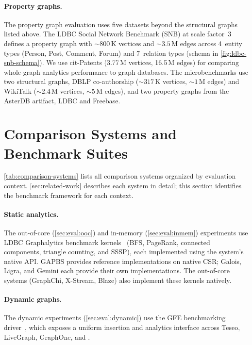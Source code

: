 \paragraph{Property graphs.}
The property graph evaluation uses five datasets beyond the structural graphs listed above.
The LDBC Social Network Benchmark (SNB) at scale factor~3 defines a property graph with ${\sim}800$\,K vertices and ${\sim}3.5$\,M edges across 4~entity types (Person, Post, Comment, Forum) and 7~relation types (schema in
\autoref{fig:ldbc-snb-schema}).
We use cit-Patents (3.77\,M vertices, 16.5\,M edges) for comparing whole-graph analytics performance to graph databases.
The microbenchmarks use two structural graphs, DBLP co-authorship (${\sim}317$\,K vertices, ${\sim}1$\,M edges) and WikiTalk (${\sim}2.4$\,M vertices, ${\sim}5$\,M edges), and two property graphs from the AsterDB artifact, LDBC and Freebase.

\section{Comparison Systems and Benchmark Suites}
\label{sec:eval:systems}

\autoref{tab:comparison-systems} lists all comparison systems organized by evaluation context.
\autoref{sec:related-work} describes each system in detail; this section identifies the benchmark framework for each context.

\paragraph{Static analytics.}
The out-of-core (\autoref{sec:eval:ooc}) and in-memory (\autoref{sec:eval:inmem}) experiments use LDBC Graphalytics benchmark kernels~\cite{LDBCGrapalytics22:online} (BFS, PageRank, connected components, triangle counting, and SSSP), each implemented using the system's native API.
GAPBS provides reference implementations on native CSR; Galois, Ligra, and Gemini each provide their own implementations.
The out-of-core systems (GraphChi, X-Stream, Blaze) also implement these kernels natively.

\paragraph{Dynamic graphs.}
The dynamic experiments (\autoref{sec:eval:dynamic}) use the GFE benchmarking driver~\cite{teseo2021deLeo}, which exposes a uniform insertion and analytics interface across Teseo, LiveGraph, GraphOne, and \project{}.

